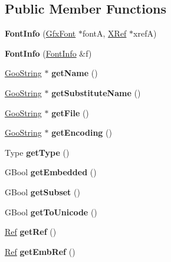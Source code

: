 \subsection*{Public Member Functions}
\begin{DoxyCompactItemize}
\item 
\mbox{\label{class_font_info_ab8ea29651b88970b4d643fb5323b6fed}} 
{\bfseries Font\+Info} (\hyperlink{class_gfx_font}{Gfx\+Font} $\ast$fontA, \hyperlink{class_x_ref}{X\+Ref} $\ast$xrefA)
\item 
\mbox{\label{class_font_info_a30a8a45ab9e00cae43f88e64cef84c2b}} 
{\bfseries Font\+Info} (\hyperlink{class_font_info}{Font\+Info} \&f)
\item 
\mbox{\label{class_font_info_a6d72653a1f93b3faf1623d0e8946c148}} 
\hyperlink{class_goo_string}{Goo\+String} $\ast$ {\bfseries get\+Name} ()
\item 
\mbox{\label{class_font_info_acbecb612b1c492c6b34d9627960b261a}} 
\hyperlink{class_goo_string}{Goo\+String} $\ast$ {\bfseries get\+Substitute\+Name} ()
\item 
\mbox{\label{class_font_info_a26f807cb4cef50d64239abeb40ef6b84}} 
\hyperlink{class_goo_string}{Goo\+String} $\ast$ {\bfseries get\+File} ()
\item 
\mbox{\label{class_font_info_a760d445c6179579abe4f06cc559b1d66}} 
\hyperlink{class_goo_string}{Goo\+String} $\ast$ {\bfseries get\+Encoding} ()
\item 
\mbox{\label{class_font_info_a690e5553ea12f894de2169967aa37887}} 
Type {\bfseries get\+Type} ()
\item 
\mbox{\label{class_font_info_a3dcb80cd77553a2a4cbe2e7afd9ba344}} 
G\+Bool {\bfseries get\+Embedded} ()
\item 
\mbox{\label{class_font_info_aa3dc8f9f25d4832a97665ba0f4e87feb}} 
G\+Bool {\bfseries get\+Subset} ()
\item 
\mbox{\label{class_font_info_a4e1e8a33c03691673295e077dc5f25fb}} 
G\+Bool {\bfseries get\+To\+Unicode} ()
\item 
\mbox{\label{class_font_info_a7c5ec8b8298bb123ce3fb5a18d50adbf}} 
\hyperlink{struct_ref}{Ref} {\bfseries get\+Ref} ()
\item 
\mbox{\label{class_font_info_a145d1fde22c8d0ed8aa9c6652fa26f32}} 
\hyperlink{struct_ref}{Ref} {\bfseries get\+Emb\+Ref} ()
\end{DoxyCompactItemize}


